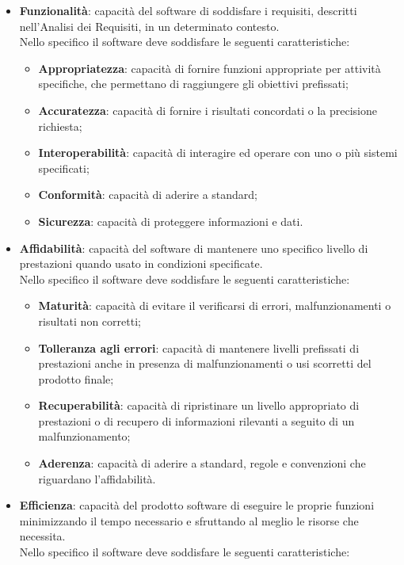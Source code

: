 	\begin{itemize}
		\item \textbf{Funzionalità}: capacità del software di soddisfare i requisiti, descritti nell'Analisi dei Requisiti, in un determinato contesto.\\
Nello specifico il software deve soddisfare le seguenti caratteristiche:
		\begin{itemize}
			\item \textbf{Appropriatezza}: capacità di fornire funzioni appropriate per attività specifiche, che permettano di raggiungere gli obiettivi prefissati;
			\item \textbf{Accuratezza}: capacità di fornire i risultati concordati o la precisione richiesta;
			\item \textbf{Interoperabilità}: capacità di interagire ed operare con uno o più sistemi specificati;
			\item \textbf{Conformità}: capacità di aderire a standard;
			\item \textbf{Sicurezza}: capacità di proteggere informazioni e dati.
		\end{itemize}
\item \textbf{Affidabilità}: capacità del software di mantenere uno specifico livello di prestazioni quando usato in condizioni specificate.\\
Nello specifico il software deve soddisfare le seguenti caratteristiche:
		\begin{itemize}
			\item \textbf{Maturità}: capacità di evitare il verificarsi di errori, malfunzionamenti o risultati non corretti;
			\item \textbf{Tolleranza agli errori}: capacità di mantenere livelli prefissati di prestazioni anche in presenza di malfunzionamenti o usi scorretti del prodotto finale;
			\item \textbf{Recuperabilità}: capacità di ripristinare un livello appropriato di prestazioni o di recupero di informazioni rilevanti a seguito di un malfunzionamento;
			\item \textbf{Aderenza}:  capacità di aderire a standard, regole e convenzioni che riguardano l'affidabilità.
		\end{itemize}
\item \textbf{Efficienza}: capacità del prodotto software di eseguire le proprie funzioni minimizzando il tempo necessario e sfruttando al meglio le risorse che necessita.\\
Nello specifico il software deve soddisfare le seguenti caratteristiche:

\end{itemize}
